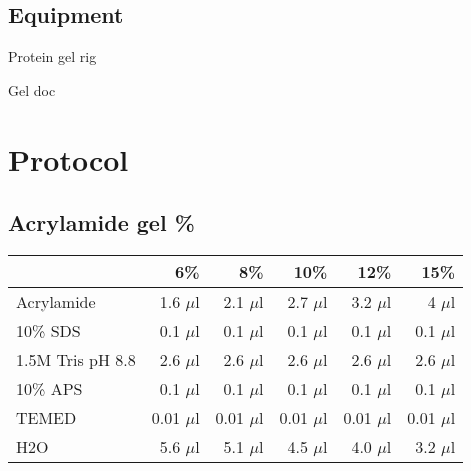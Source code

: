 	\subsection{Equipment}
	\begin{packed_enum}
		\item Protein gel rig
		\item Gel doc
	\end{packed_enum}
 

\section{Protocol}
	\subsection{Acrylamide gel \%}
	\begin{tabular}{l r r r r r}
	{\bf   } & {\bf 6\%} & {\bf 8\%} & {\bf 10\%} & {\bf 12\%} & {\bf 15\%}\\
			\hline
	Acrylamide	&	1.6 $\mu$l	& 2.1 $\mu$l & 2.7 $\mu$l & 3.2 $\mu$l &	4 $\mu$l \\
	10\% SDS		 & 0.1 $\mu$l	 & 0.1 $\mu$l & 	0.1 $\mu$l & 	0.1 $\mu$l	 & 0.1 $\mu$l\\
	1.5M Tris pH 8.8  & 2.6 $\mu$l	 & 2.6 $\mu$l	 & 2.6 $\mu$l	 & 2.6 $\mu$l	& 2.6 $\mu$l\\
	10\% APS		 & 0.1 $\mu$l	 & 0.1 $\mu$l	 & 0.1 $\mu$l	 & 0.1 $\mu$l	 & 0.1 $\mu$l\\
	TEMED		 & 0.01 $\mu$l & 0.01 $\mu$l & 0.01 $\mu$l	 & 0.01 $\mu$l	 & 0.01 $\mu$l\\
	H2O		 & 5.6 $\mu$l	 & 5.1 $\mu$l	 & 4.5 $\mu$l	 & 4.0 $\mu$l	 & 3.2 $\mu$l\\
		\hline
	
	\end{tabular}
